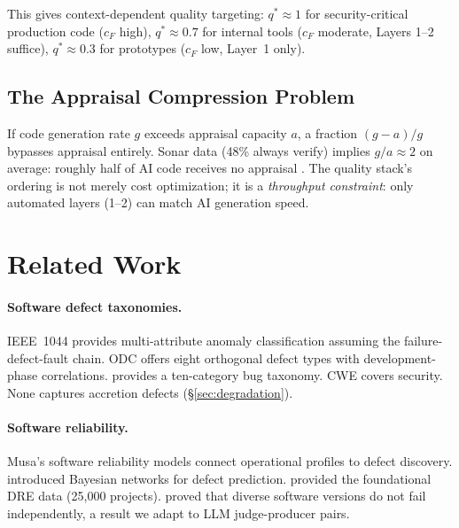 \documentclass[11pt, a4paper, logo, copyright]{googledeepmind}
\begin{document}
This gives context-dependent quality targeting: $q^* \approx 1$ for security-critical production code ($c_F$ high), $q^* \approx 0.7$ for internal tools ($c_F$ moderate, Layers 1--2 suffice), $q^* \approx 0.3$ for prototypes ($c_F$ low, Layer~1 only).

\subsection{The Appraisal Compression Problem}

If code generation rate $g$ exceeds appraisal capacity $a$, a fraction $(g-a)/g$ bypasses appraisal entirely. Sonar data (48\% always verify) implies $g/a \approx 2$ on average: roughly half of AI code receives no appraisal \citep{sonar2026}. The quality stack's ordering is not merely cost optimization; it is a \emph{throughput constraint}: only automated layers (1--2) can match AI generation speed.


\section{Related Work}
\label{sec:related}

\paragraph{Software defect taxonomies.} IEEE~1044 \citep{ieee1044} provides multi-attribute anomaly classification assuming the failure-defect-fault chain. ODC \citep{chillarege1992} offers eight orthogonal defect types with development-phase correlations. \citet{beizer1990} provides a ten-category bug taxonomy. CWE covers security. None captures accretion defects (\S\ref{sec:degradation}).

\paragraph{Software reliability.} Musa's software reliability models \citep{musa1987} connect operational profiles to defect discovery. \citet{fenton1999} introduced Bayesian networks for defect prediction. \citet{capersjones2012} provided the foundational DRE data (25,000 projects). \citet{littlewood1993, littlewood2000} proved that diverse software versions do not fail independently, a result we adapt to LLM judge-producer pairs.
\end{document}
